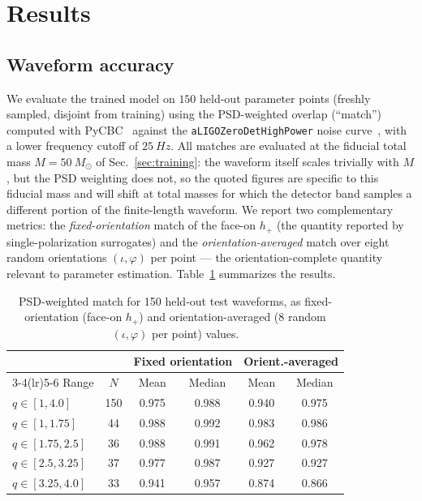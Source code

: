 \documentclass[aps,prd,twocolumn,superscriptaddress,longbibliography]{revtex4-2}
\begin{document}
\section{Results}
\label{sec:results}

\subsection{Waveform accuracy}
\label{sec:accuracy}

We evaluate the trained model on $150$ held-out parameter points
(freshly sampled, disjoint from training) using the PSD-weighted overlap
(``match'')~\cite{Cutler:1994pb} computed with PyCBC~\cite{Usman:2016}
against the \texttt{aLIGOZeroDetHighPower} noise curve~\cite{aLIGO:2015},
with a lower frequency cutoff of $\SI{25}{Hz}$.
All matches are evaluated at the fiducial total mass
$M=\SI{50}{M_\odot}$ of Sec.~\ref{sec:training}: the waveform itself
scales trivially with $M$, but the PSD weighting does not, so the quoted
figures are specific to this fiducial mass and will shift at total masses
for which the detector band samples a different portion of the
finite-length waveform.
We report two complementary
metrics: the \emph{fixed-orientation} match of the face-on $h_+$ (the
quantity reported by single-polarization surrogates) and the
\emph{orientation-averaged} match over eight random orientations
$(\iota,\varphi)$ per point --- the orientation-complete quantity relevant to
parameter estimation. Table~\ref{tab:matches} summarizes the results.

\begin{table}[h]
\centering
\caption{PSD-weighted match for 150 held-out test waveforms, as
fixed-orientation (face-on $h_+$) and orientation-averaged
(8 random $(\iota,\varphi)$ per point) values.}
\label{tab:matches}
\begin{tabular}{lccccc}
\toprule
 & & \multicolumn{2}{c}{Fixed orientation} & \multicolumn{2}{c}{Orient.-averaged} \\
\cmidrule(lr){3-4}\cmidrule(lr){5-6}
Range & $N$ & Mean & Median & Mean & Median \\
\midrule
$q\in[1,4.0]$    & 150 & 0.975 & 0.988 & 0.940 & 0.975 \\
\midrule
$q\in[1,1.75]$   & 44  & 0.988 & 0.992 & 0.983 & 0.986 \\
$q\in[1.75,2.5]$ & 36  & 0.988 & 0.991 & 0.962 & 0.978 \\
$q\in[2.5,3.25]$ & 37  & 0.977 & 0.987 & 0.927 & 0.927 \\
$q\in[3.25,4.0]$ & 33  & 0.941 & 0.957 & 0.874 & 0.866 \\
\bottomrule
\end{tabular}
\end{table}
\end{document}
